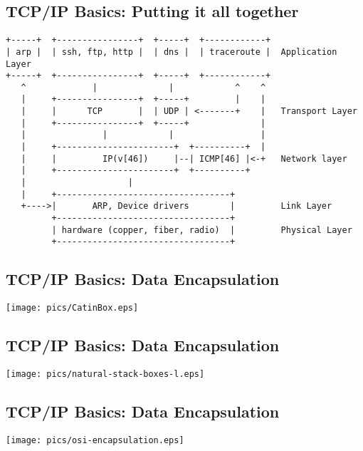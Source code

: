 \documentclass[xga]{xdvislides}
\begin{document}
\subsection{TCP/IP Basics: Putting it all together}
\begin{verbatim}
+-----+  +----------------+  +-----+  +------------+
| arp |  | ssh, ftp, http |  | dns |  | traceroute |  Application Layer
+-----+  +----------------+  +-----+  +------------+
   ^             |              |            ^    ^
   |     +----------------+  +-----+         |    |
   |     |      TCP       |  | UDP | <-------+    |   Transport Layer
   |     +----------------+  +-----+              |
   |               |            |                 |
   |     +-----------------------+  +----------+  |
   |     |         IP(v[46])     |--| ICMP[46] |<-+   Network layer
   |     +-----------------------+  +----------+
   |                    |
   |     +----------------------------------+
   +---->|       ARP, Device drivers        |         Link Layer
         +----------------------------------+
         | hardware (copper, fiber, radio)  |         Physical Layer
         +----------------------------------+
\end{verbatim}

\subsection{TCP/IP Basics: Data Encapsulation}
\vspace*{\fill}
\begin{center}
	\texttt{[image: pics/CatinBox.eps]}
\end{center}
\vspace*{\fill}

\subsection{TCP/IP Basics: Data Encapsulation}
\vspace*{\fill}
\begin{center}
	\texttt{[image: pics/natural-stack-boxes-l.eps]}
\end{center}
\vspace*{\fill}

\subsection{TCP/IP Basics: Data Encapsulation}
\vspace*{\fill}
\begin{center}
	\texttt{[image: pics/osi-encapsulation.eps]}
\end{center}
\vspace*{\fill}
\end{document}
